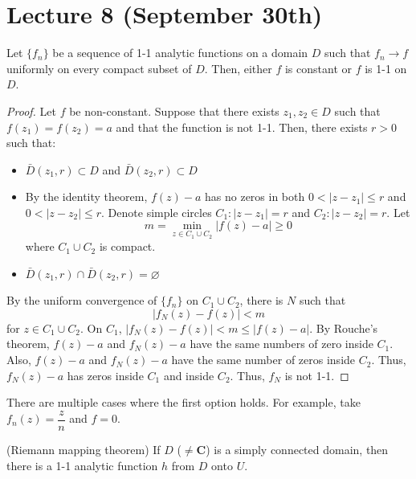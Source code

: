 \section{Lecture 8 (September 30th)}
\begin{thm}
Let $\{f_{n}\}$ be a sequence of 1-1 analytic functions on a domain $D$ such that $f_{n}\rightarrow f$ uniformly on every compact subset of $D$. Then, either $f$ is constant or $f$ is 1-1 on $D$. 
\end{thm}
\vspace{2ex}
\begin{proof}
Let $f$ be non-constant. Suppose that there exists $z_1,z_2\in D$ such that $f(z_1)=f(z_2)=a$ and that the function is not 1-1. Then, there exists $r>0$ such that:
\begin{itemize}
\item[(i)] $\bar{D}(z_1,r)\subset D$ and $\bar{D}(z_2, r)\subset D$
\item[(ii)] By the identity theorem, $f(z)-a$ has no zeros in both $0<|z-z_1|\leq r$ and $0<|z-z_2|\leq r$. Denote simple circles $C_1:|z-z_1|=r$ and $C_2:|z-z_2|=r$. Let 
\[m=\min_{z\in C_1\cup C_2}|f(z)-a|\geq 0\]
where $C_1\cup C_2$ is compact.
\item[(iii)] $\bar{D}(z_1,r)\cap  \bar{D}(z_2,r)=\varnothing$
\end{itemize}
By the uniform convergence of $\{f_{n}\}$ on $C_1\cup C_2$, there is $N$ such that 
\[|f_{N}(z)-f(z)|<m\]
for $z\in C_1\cup C_2$. On $C_1$, $|f_{N}(z)-f(z)|<m\leq |f(z)-a|$. By Rouche's theorem, $f(z)-a$ and $f_{N}(z)-a$ have the same numbers of zero inside $C_1$. Also, $f(z)-a$ and $f_{N}(z)-a$ have the same number of zeros inside $C_2$. Thus, $f_{N}(z)-a$ has zeros inside $C_1$ and inside $C_2$. Thus, $f_{N}$ is not 1-1.
\end{proof}
\vspace{2ex}
\begin{ex}
There are multiple cases where the first option holds. For example, take $f_{n}(z)=\dfrac{z}{n}$ and $f=0$. 
\end{ex}
\vspace{2ex}
\begin{thm}
(Riemann mapping theorem) If $D$ ($\ne {\bm C}$) is a simply connected domain, then there is a 1-1 analytic function $h$ from $D$ onto $U$. 
\end{thm}
\vspace{2ex}
